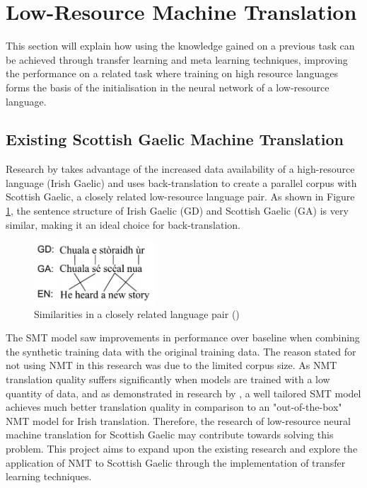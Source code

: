 

\section{Low-Resource Machine Translation}
\label{sec:2-low_resource_approaches}
This section will explain how using the knowledge gained on a previous task can be achieved through transfer learning and meta learning techniques, improving the performance on a related task where training on high resource languages forms the basis of the initialisation in the neural network of a low-resource language.

\subsection{Existing Scottish Gaelic Machine Translation}

Research by \cite{dowling_leveraging_2019} takes advantage of the increased data availability of a high-resource language (Irish Gaelic) and uses back-translation to create a parallel corpus with Scottish Gaelic, a closely related low-resource language pair. As shown in Figure \ref{fig:lang_pair}, the sentence structure of Irish Gaelic (GD) and Scottish Gaelic (GA) is very similar, making it an ideal choice for back-translation.

\begin{figure}[ht!]
\centering
\includegraphics[width=0.4\textwidth]{media/literature/nmt_approaches/lr_gaelic.png}
\caption[Diagram of the similarities in a closely related language pair]{Similarities in a closely related language pair (\cite{dowling_leveraging_2019})}
\label{fig:lang_pair}
\end{figure}


The \acrshort{SMT} model saw improvements in performance over baseline when combining the synthetic training data with the original training data. The reason stated for not using \acrshort{NMT} in this research was due to the limited corpus size. As \acrshort{NMT} translation quality suffers significantly when models are trained with a low quantity of data, and as demonstrated in research by \cite{dowling_smt_2018}, a well tailored \acrshort{SMT} model achieves much better translation quality in comparison to an "out-of-the-box" \acrshort{NMT} model for Irish translation. Therefore, the research of low-resource neural machine translation for Scottish Gaelic may contribute towards solving this problem. This project aims to expand upon the existing research and explore the application of \acrshort{NMT} to Scottish Gaelic through the implementation of transfer learning techniques.

